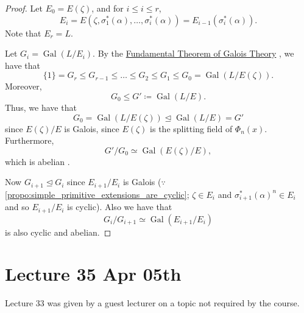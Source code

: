 \documentclass[notoc,notitlepage,nobib]{tufte-book}
\DeclareMathOperator{\Gal}{Gal}
\begin{document}
\begin{proof}
  \hlbnoted{$\Gal(L / E)$ is solvable} Let $E_0 = E(\zeta)$, and for $i \leq i
  \leq r$,
  \begin{equation*}
    E_i = E(\zeta, \sigma_1^*(\alpha), \ldots, \sigma_i^*(\alpha)) =
    E_{i-1}(\sigma_i^*(\alpha)).
  \end{equation*}
  Note that $E_r = L$.

  Let $G_i = \Gal(L / E_i)$. By the
  \hyperref[thm:fundamental_theorem_of_galois_theory]{Fundamental Theorem of
  Galois Theory} , we have that
  \begin{equation*}
    \{1\} = G_r \leq G_{r-1} \leq \hdots \leq G_2 \leq G_1 \leq G_0 = \Gal(L /
    E(\zeta)).
  \end{equation*}
  Moreover,
  \begin{equation*}
    G_0 \leq G' \coloneqq \Gal(L / E).
  \end{equation*}
  Thus, we have that
  \begin{equation*}
    G_0 = \Gal(L / E(\zeta)) \trianglelefteq \Gal(L / E) = G'
  \end{equation*}
  since $E(\zeta) / E$ is Galois, since $E(\zeta)$ is the splitting field of
  $\Phi_n(x)$. Furthermore,
  \begin{equation*}
    G' / G_0 \simeq \Gal(E(\zeta) / E),
  \end{equation*}
  which is abelian .

  Now $G_{i+1} \trianglelefteq G_i$ since $E_{i+1} / E_i$ is Galois ($\because$ 
  \cref{propo:simple_primitive_extensions_are_cyclic}; $\zeta \in E_i$ and
  $\sigma_{i+1}^*(\alpha)^n \in E_i$ and so $E_{i+1} / E_i$ is cyclic). Also we
  have that
  \begin{equation*}
    G_i / G_{i+1} \simeq \Gal(E_{i+1} / E_i)
  \end{equation*}
  is also cyclic and abelian.
\end{proof} 



\chapter{Lecture 35 Apr 05th}%
\label{chp:lecture_35_apr_05th}

Lecture 33 was given by a guest lecturer on a topic not required by the course.
\end{document}
